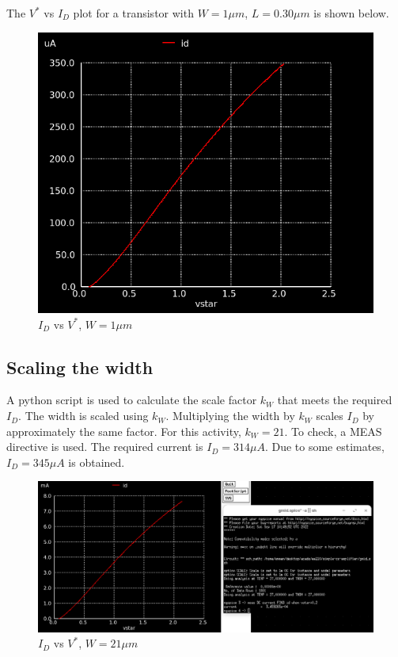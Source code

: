 \documentclass[conference]{IEEEtran}
\begin{document}
The $V^*$ vs $I_D$ plot for a transistor with $W=1\mu m$, $L=0.30 \mu m$ is shown below. 
\begin{figure}[H]
	\centering 
	\includegraphics[scale=0.38]{vstar-id.png}
	\caption{$I_D$ vs $V^*$, $W=1\mu m$}
	\label{vstar-id}
\end{figure}
\subsection{Scaling the width}
A python script is used to calculate the scale factor $k_W$ that meets the required $I_D$. The width is scaled using $k_W$. Multiplying the width by $k_W$ scales $I_D$ by approximately the same factor. For this activity, $k_W=21$.
To check, a MEAS directive is used. The required current is $I_D=314\mu A$. Due to some estimates, $I_D=345\mu A$ is obtained.  
\begin{figure}[H]
	\centering 
	\includegraphics[width=\columnwidth]{vstar-scale-id.png}
	\caption{$I_D$ vs $V^*$, $W=21\mu m$}
	\label{vstar-scale-id}
\end{figure}
\end{document}
